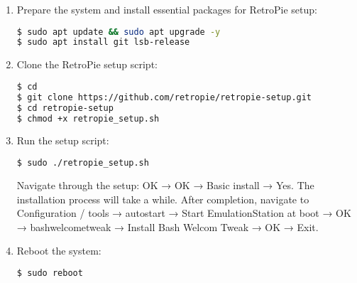 \begin{enumerate}
\item Prepare the system and install essential packages for RetroPie setup:  
\begin{lstlisting}[language=bash, breaklines=true, breakatwhitespace=true, columns=fullflexible]
$ sudo apt update && sudo apt upgrade -y  
$ sudo apt install git lsb-release
\end{lstlisting}

\item Clone the RetroPie setup script:
\begin{lstlisting}[language=bash, breaklines=true, breakatwhitespace=true, columns=fullflexible]
$ cd
$ git clone https://github.com/retropie/retropie-setup.git
$ cd retropie-setup
$ chmod +x retropie_setup.sh
\end{lstlisting}

\item Run the setup script:
\begin{lstlisting}[language=bash, breaklines=true, breakatwhitespace=true, columns=fullflexible]
$ sudo ./retropie_setup.sh
\end{lstlisting}
Navigate through the setup: OK → OK → Basic install → Yes. The installation process will take a while. After completion, navigate to Configuration / tools → autostart → Start EmulationStation at boot → OK → bashwelcometweak → Install Bash Welcom Tweak → OK → Exit.

\item Reboot the system:
\begin{lstlisting}[language=bash, breaklines=true, breakatwhitespace=true, columns=fullflexible]
$ sudo reboot
\end{lstlisting}


\end{enumerate}

